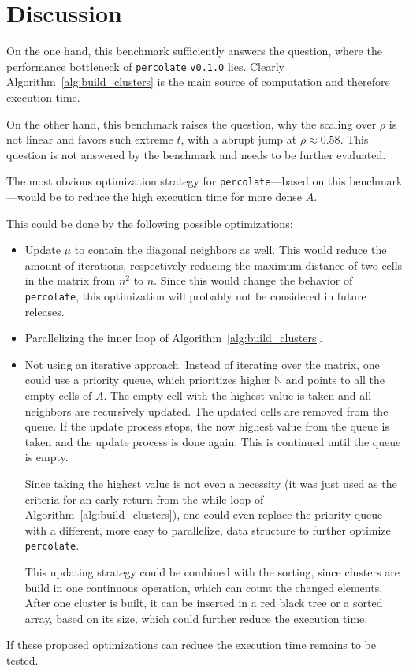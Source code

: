 \documentclass[twoside,11pt]{article}
\def\perc{\texttt{perco\-late}}
\def\v{\texttt{v0.1.0}}
\begin{document}

\section{Discussion} %

On the one hand, this benchmark sufficiently answers the
question, where the performance bottleneck of \perc{} \v{}
lies.
Clearly Algorithm~\ref{alg:build_clusters} is the main
source of computation and therefore execution time.

On the other hand, this benchmark raises the question, why
the scaling over $\rho$ is not linear and favors such
extreme $t$, with a abrupt jump at $\rho \approx 0.58$.
This question is not answered by the benchmark and needs to
be further evaluated.

The most obvious optimization strategy for \perc{}---based
on this benchmark---would be to reduce the high execution
time for more dense $A$.

This could be done by the following possible optimizations:
\begin{itemize}
  \item Update $\mu$ to contain the diagonal neighbors as
        well. This would reduce the amount of iterations,
        respectively reducing the maximum distance of two
        cells in the matrix from $n^2$ to $n$.
        Since this would change the behavior of \perc{},
        this optimization will probably not be considered
        in future releases.

  \item Parallelizing the inner loop of
        Algorithm~\ref{alg:build_clusters}.

  \item Not using an iterative approach. Instead of
        iterating over the matrix, one could use a priority
        queue, which prioritizes higher $\mathbb{N}$
        and points to all the empty cells of $A$.
        The empty cell with the highest value is taken and
        all neighbors are recursively updated.
        The updated cells are removed from the queue.
        If the update process stops, the now highest value
        from the queue is taken and the update
        process is done again.
        This is continued until the queue is empty.

        Since taking the highest value is not even a
        necessity (it was just used as the criteria for
        an early return from the while-loop of
        Algorithm~\ref{alg:build_clusters}), one could
        even replace the priority queue with a different,
        more easy to parallelize, data structure to further
        optimize \perc.

        This updating strategy could be combined with the
        sorting, since clusters are build in one continuous
        operation, which can count the changed elements.
        After one cluster is built, it can be inserted in
        a red black tree or a sorted array, based on its
        size, which could further reduce the execution
        time.

\end{itemize}
If these proposed optimizations can reduce the execution
time remains to be tested.
\end{document}

